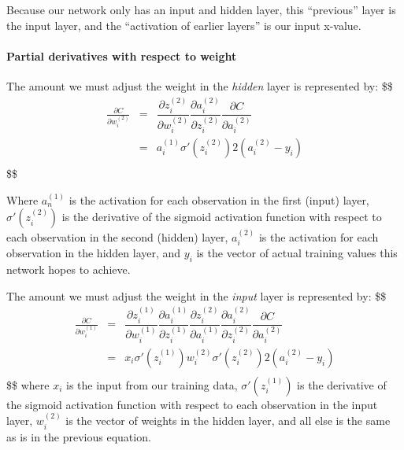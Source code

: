 Because our network only has an input and hidden layer, this
``previous'' layer is the input layer, and the ``activation of earlier
layers'' is our input x-value.

\hypertarget{partial-derivatives-with-respect-to-weight}{%
\paragraph{Partial derivatives with respect to
weight}\label{partial-derivatives-with-respect-to-weight}}

The amount we must adjust the weight in the \emph{hidden} layer is
represented by: \$\$ \begin{eqnarray}
\frac{\partial{C}}{\partial{w_i^{(2)}}}    &=&  \dfrac{\partial{z_i^{(2)}}}{\partial{w_i^{(2)}}}
     \dfrac{\partial{a_i^{(2)}}}{\partial{z_i^{(2)}}}
     \dfrac{\partial{C}}{\partial{a_i^{(2)}}} \\
     
 &=& a_i^{(1)} \sigma'(z_i^{(2)}) 2(a_i^{(2)}-y_i) \\
\end{eqnarray} \$\$

Where \(a_n^{(1)}\) is the activation for each observation in the first
(input) layer, \(\sigma'(z_i^{(2)})\) is the derivative of the sigmoid
activation function with respect to each observation in the second
(hidden) layer, \(a_i^{(2)}\) is the activation for each observation in
the hidden layer, and \(y_i\) is the vector of actual training values
this network hopes to achieve.

The amount we must adjust the weight in the \emph{input} layer is
represented by: \$\$ \begin{eqnarray}
\frac{\partial{C}}{\partial{w_i^{(1)}}}    &=& \dfrac{\partial{z_i^{(1)}}}{\partial{w_i^{(1)}}} \dfrac{\partial{a_i^{(1)}}}{\partial{z_i^{(1)}}}  \dfrac{\partial{z_i^{(2)}}}{\partial{a_i^{(1)}}}
     \dfrac{\partial{a_i^{(2)}}}{\partial{z_i^{(2)}}}
     \dfrac{\partial{C}}{\partial{a_i^{(2)}}} \\
     
&=& x_i \sigma'(z_i^{(1)}) w_i^{(2)} \sigma'(z_i^{(2)}) 2(a_i^{(2)}-y_i) \\

\end{eqnarray} \$\$ where \(x_i\) is the input from our training data,
\(\sigma'(z_i^{(1)})\) is the derivative of the sigmoid activation
function with respect to each observation in the input layer,
\(w_i^{(2)}\) is the vector of weights in the hidden layer, and all else
is the same as is in the previous equation.

